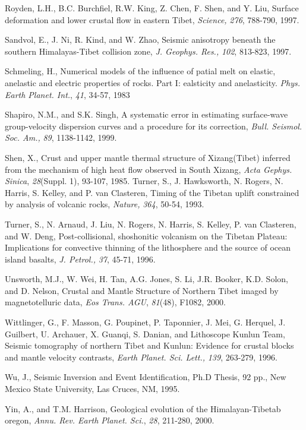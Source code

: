 \documentclass[12pt]{article}
\begin{document}
\begin{references}
Royden, L.H., B.C. Burchfiel, R.W. King, Z. Chen, F. Shen, and Y. Liu,
Surface deformation and lower crustal flow in eastern Tibet, {\it Science,}
{\it 276}, 788-790, 1997.

Sandvol, E., J. Ni, R. Kind, and W. Zhao, Seismic anisotropy
beneath the southern Himalayas-Tibet collision zone, {\it J. Geophys. Res.,}
{\it 102}, 813-823, 1997.

Schmeling, H., Numerical models of the influence of patial melt on
elastic, anelastic and electric properties of rocks. Part I:
ealsticity and anelasticity. {\it Phys. Earth Planet. Int.}, {\it 41}, 
34-57, 1983

Shapiro, N.M., and S.K. Singh, A systematic error in estimating
surface-wave group-velocity dispersion curves and a procedure for its
correction, {\it Bull. Seismol. Soc. Am.,} {\it 89}, 1138-1142, 1999.

Shen, X., Crust and upper mantle thermal structure of Xizang(Tibet)
inferred from the mechanism of high heat flow observed in South
Xizang, {\it Acta Gephys. Sinica}, {\it 28}(Suppl. 1), 93-107, 1985.
Turner, S., J. Hawksworth, N. Rogers, N. Harris, S. Kelley, and P. van 
Clasteren, Timing of the Tibetan uplift constrained
by analysis of volcanic rocks, {\it Nature,} {\it 364}, 50-54, 1993.

Turner, S., N. Arnaud, J. Liu, N. Rogers, N. Harris, S. Kelley, P. van
Clasteren, and W. Deng, Post-collisional, shoshonitic volcanism
on the Tibetan Plateau: Implications for convective thinning of the
lithosphere and the source of ocean island basalts, {\it J. Petrol.,}
{\it 37}, 45-71, 1996.

Unsworth, M.J., W. Wei, H. Tan, A.G. Jones, S. Li, J.R. Booker, K.D. Solon,
and D. Nelson, Crustal and Mantle Structure of Northern Tibet imaged by
magnetotelluric data, {\it Eos Trans. AGU}, {\it 81}(48), F1082, 2000.

Wittlinger, G., F. Masson, G. Poupinet, P. Taponnier, J. Mei, G. Herquel,
J. Guilbert, U. Archauer, X. Guanqi, S. Danian, and Lithoscope Kunlun Team,
Seismic tomography of northern Tibet and Kunlun: Evidence for crustal blocks
and mantle velocity contrasts, {\it Earth Planet. Sci. Lett.,} {\it 139},
263-279, 1996.

Wu, J., Seismic Inversion and Event Identification, Ph.D Thesis, 92 pp.,
New Mexico State University, Las Cruces, NM, 1995.

Yin, A., and T.M. Harrison, Geological evolution of the 
Himalayan-Tibetab oregon, {\it Annu. Rev. Earth Planet. Sci.}, {\it 28}, 211-280, 
2000. 


\end{references}
\end{document}
